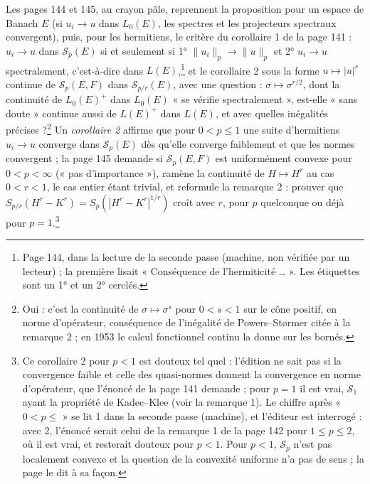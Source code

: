 \documentclass[11pt,a4paper]{article}
\begin{document}
Les pages 144 et 145, au crayon pâle, reprennent la proposition pour un
espace de Banach $E$ (si $u_i \to u$ dans $L_0(E)$, les spectres et les
projecteurs spectraux convergent), puis, pour les hermitiens, le critère
du corollaire 1 de la page 141 : $u_i \to u$ dans $\mathcal{S}_p(E)$ si et
seulement si 1° $\|u_i\|_p \to \|u\|_p$ et 2° $u_i \to u$ spectralement,
c'est-à-dire dans $L(E)$,\footnote{Page 144, dans la lecture de la seconde
passe (machine, non vérifiée par un lecteur) ; la première lisait
« Conséquence de l'hermiticité … ». Les étiquettes sont un 1° et un 2°
cerclés.} et le corollaire 2 sous la forme
$u \mapsto |u|^r$ continue de $\mathcal{S}_p(E,F)$ dans $\mathcal{S}_{p/r}(E)$,
avec une question : $\sigma \mapsto \sigma^{r/2}$, dont la continuité de
$L_0(E)^{+}$ dans $L_0(E)$ « se vérifie spectralement », est-elle « sans
doute » continue aussi de $L(E)^{+}$ dans $L(E)$, et avec quelles inégalités
précises ?\footnote{Oui :
c'est la continuité de $\sigma \mapsto \sigma^{s}$ pour $0 < s < 1$ sur le cône
positif, en norme d'opérateur, conséquence de l'inégalité de Powers--Størmer
citée à la remarque 2 ; en 1953 le calcul fonctionnel continu la donne
sur les bornés.} Un \emph{corollaire 2} affirme que pour $0 < p \leq 1$
une suite d'hermitiens $u_i \to u$ converge dans $\mathcal{S}_p(E)$ dès
qu'elle converge faiblement et que les normes convergent ; la page 145
demande si $\mathcal{S}_p(E,F)$ est uniformément convexe pour $0 < p <
\infty$ (« pas d'importance »), ramène la continuité de $H \mapsto H^r$
au cas $0 < r < 1$, le cas entier étant trivial, et reformule la remarque 2 : prouver que
$S_{p/r}(H^r - K^r) = S_p(|H^r - K^r|^{1/r})$ croît avec $r$, pour $p$
quelconque ou déjà pour $p = 1$.\footnote{Ce corollaire 2 pour $p < 1$ est
douteux tel quel : l'édition ne sait pas si la convergence faible et celle
des quasi-normes donnent la convergence en norme d'opérateur, que l'énoncé
de la page 141 demande ; pour $p = 1$ il est vrai, $\mathcal{S}_1$ ayant la
propriété de Kadec--Klee (voir la remarque 1). Le chiffre après « $0 < p
\leq$ » se lit 1 dans la seconde passe (machine), et l'éditeur est
interrogé : avec 2, l'énoncé serait celui de la remarque 1 de la page 142
pour $1 \leq p \leq 2$, où il est vrai, et resterait douteux pour $p <
1$. Pour $p < 1$, $\mathcal{S}_p$ n'est pas localement
convexe et la question de la convexité uniforme n'a pas de sens ; la page
le dit à sa façon.}
\end{document}
